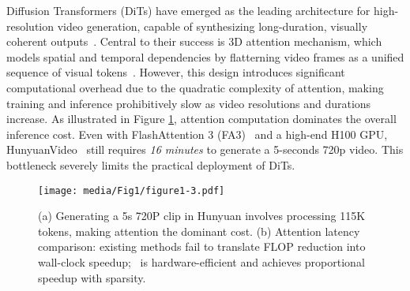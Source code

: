 \label{sec:introduction}

Diffusion Transformers (DiTs) have emerged as the leading architecture for high-resolution video generation, capable of synthesizing long-duration, visually coherent outputs~\citep{peebles2023scalable, openai_sora}. Central to their success is 3D attention mechanism, which models spatial and temporal dependencies by flatterning video frames as a unified sequence of visual tokens~\citep{yang2024cogvideox, genmo2024mochi, kong2025hunyuanvideosystematicframeworklarge}. 
However, this design introduces significant computational overhead due to the quadratic complexity of attention, making training and inference prohibitively slow as video resolutions and durations increase. As illustrated in Figure \ref{fig:kernel_sparsity_speedup}, attention computation dominates the overall inference cost. 
Even with FlashAttention 3 (FA3)~\cite{shah2024flashattention3fastaccurateattention} and a high-end H100 GPU, HunyuanVideo~\citep{kong2025hunyuanvideosystematicframeworklarge} still requires \emph{16 minutes} to generate a 5-seconds 720p video. This bottleneck severely limits the practical deployment of DiTs.



\begin{figure}[t]
   \centering
   \texttt{[image: media/Fig1/figure1-3.pdf]}
   \caption{(a) Generating a 5s 720P clip in Hunyuan involves processing 115K tokens, making attention the dominant cost. (b) Attention latency comparison: existing methods fail to translate FLOP reduction into wall-clock speedup; \methodnameshort~is hardware-efficient and achieves proportional speedup with sparsity.}
   \vspace{-15pt}
   \label{fig:kernel_sparsity_speedup}
\end{figure}




